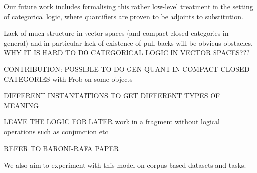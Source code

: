 Our future work includes formalising this rather low-level treatment in the setting of categorical logic, where quantifiers are proven to be adjoints to substitution. 


Lack of much structure in vector spaces (and compact closed categories in general) and in particular lack of existence of pull-backs will be obvious obstacles.  WHY IT IS HARD TO DO CATEGORICAL LOGIC IN VECTOR SPACES???


CONTRIBUTION: POSSIBLE TO DO GEN QUANT IN COMPACT CLOSED CATEGORIES with Frob on some objects

DIFFERENT INSTANTAITIONS TO GET DIFFERENT TYPES OF MEANING

LEAVE THE LOGIC FOR LATER work in a fragment without logical operations such as conjunction etc


REFER TO BARONI-RAFA PAPER

We also aim to experiment with this model on corpus-based datasets and tasks. 



